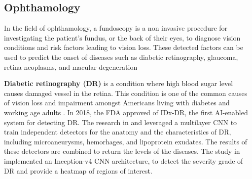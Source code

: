 \documentclass[a4paper]{article}
\begin{document}
\subsection{Ophthamology}
In the field of ophthamology, a fundoscopy is a non invasive procedure for investigating the patient's fundus, or the back of their eyes, to diagnose vision conditions and risk factors leading to vision loss.
These detected factors can be used to predict the onset of diseases such as diabetic retinography, glaucoma, retina neoplasms, and macular degeneration \cite{kumar_artificial_2023}

\textbf{Diabetic retinography (DR)} is a condition where high blood sugar level causes damaged vessel in the retina. 
This condition is one of the common causes of vision loss and impairment amongst Americans living with diabetes and working age adults \cite{commissioner_fda_2020,abramoff_pivotal_2018}.
In 2018, the FDA approved of IDx-DR, the first AI-enabled system for detecting DR.
The research in \cite{abramoff_improved_2016} and \cite{abramoff_pivotal_2018} leveraged a multilayer CNN to train independent detectors for the anatomy and the characteristics of DR, including microaneurysms, hemorhages, and lipoprotein exudates.
The results of these detectors are combined to return the levels of the diseases. 
The study in \cite{sayres_using_2019} implemented an Inception-v4 CNN architecture, to detect the severity grade of DR and provide a heatmap of regions of interest.
\end{document}
